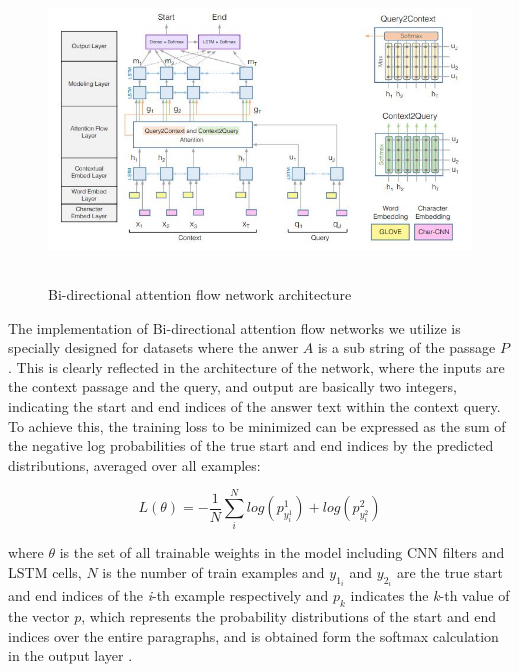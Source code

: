 \documentclass[11pt,a4paper]{article}
\begin{document}
\begin{figure}
  \includegraphics[width=\textwidth,height=8cm]{bidaf_architecture.JPG}
  \caption{Bi-directional attention flow network architecture}
\end{figure}


The implementation of Bi-directional attention flow networks we utilize  \cite{bidaf:2017} is specially designed for datasets where the anwer $A$ is a sub string of the passage $P$. This is clearly reflected in the architecture of the network, where the inputs are the context passage and the query, and output are basically two integers, indicating the start and end indices of the answer text within the context query. To achieve this, the training loss to be minimized can be expressed as the sum of the negative log probabilities of the true start and end indices by the predicted distributions, averaged over all examples:

$$
L(\theta)  = - \frac{1}{N} \sum^N_i log(p^1_{y^1_i}) + log(p^2_{y^2_i})
$$

where $\theta$ is the set of all trainable weights in the model including CNN filters and LSTM cells, $N$ is the number of train examples and $y_1_i$ and $y_2_i$ are the true start and end indices of the \textit{i}-th example respectively and $p_k$ indicates the \textit{k}-th value of the vector $p$, which represents the probability distributions of the start and end indices over the entire paragraphs, and is obtained form the softmax calculation in the output layer \cite{bidaf:2017}.

%
\end{document}

